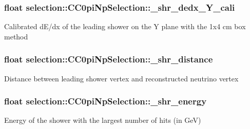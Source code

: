 \subsubsection[{\texorpdfstring{\+\_\+shr\+\_\+dedx\+\_\+\+Y\+\_\+cali}{_shr_dedx_Y_cali}}]{\setlength{\rightskip}{0pt plus 5cm}float selection\+::\+C\+C0pi\+Np\+Selection\+::\+\_\+shr\+\_\+dedx\+\_\+\+Y\+\_\+cali\hspace{0.3cm}{\ttfamily [private]}}\hypertarget{classselection_1_1CC0piNpSelection_a114f4276a8931d33d8f77fede58398fa}{}\label{classselection_1_1CC0piNpSelection_a114f4276a8931d33d8f77fede58398fa}
Calibrated d\+E/dx of the leading shower on the Y plane with the 1x4 cm box method 
\subsubsection[{\texorpdfstring{\+\_\+shr\+\_\+distance}{_shr_distance}}]{\setlength{\rightskip}{0pt plus 5cm}float selection\+::\+C\+C0pi\+Np\+Selection\+::\+\_\+shr\+\_\+distance\hspace{0.3cm}{\ttfamily [private]}}\hypertarget{classselection_1_1CC0piNpSelection_a20705dc212e16009a0ce4ace27d54af7}{}\label{classselection_1_1CC0piNpSelection_a20705dc212e16009a0ce4ace27d54af7}
Distance between leading shower vertex and reconstructed neutrino vertex 
\subsubsection[{\texorpdfstring{\+\_\+shr\+\_\+energy}{_shr_energy}}]{\setlength{\rightskip}{0pt plus 5cm}float selection\+::\+C\+C0pi\+Np\+Selection\+::\+\_\+shr\+\_\+energy\hspace{0.3cm}{\ttfamily [private]}}\hypertarget{classselection_1_1CC0piNpSelection_abf854f061d0476dc08ae8b3d71e7a86d}{}\label{classselection_1_1CC0piNpSelection_abf854f061d0476dc08ae8b3d71e7a86d}
Energy of the shower with the largest number of hits (in GeV) 
